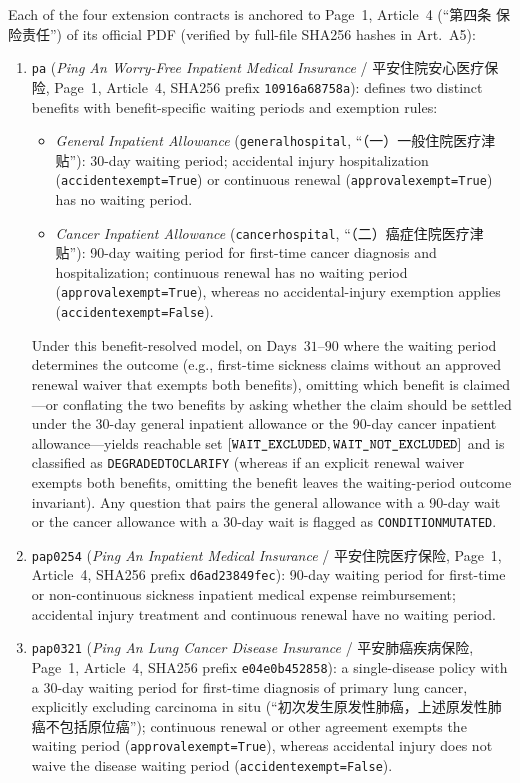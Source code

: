 \documentclass[10pt,twocolumn]{article}
\renewcommand{\_}{\textunderscore\allowbreak}
\begin{document}
Each of the four extension contracts is anchored to Page~1, Article~4 (``第四条 保险责任'') of its official PDF (verified by full-file SHA256 hashes in Art.~A5):
\begin{enumerate}[leftmargin=*,nosep]
  \item \texttt{pa\_2011\_36} (\emph{Ping An Worry-Free Inpatient Medical Insurance} / 平安住院安心医疗保险, Page~1, Article~4, SHA256 prefix \texttt{10916a68758a}): defines two distinct benefits with benefit-specific waiting periods and exemption rules:
  \begin{itemize}[leftmargin=*,nosep]
    \item \emph{General Inpatient Allowance} (\texttt{general\_hospital}, ``（一）一般住院医疗津贴''): 30-day waiting period; accidental injury hospitalization (\texttt{accident\_exempt=True}) or continuous renewal (\texttt{approval\_exempt=True}) has no waiting period.
    \item \emph{Cancer Inpatient Allowance} (\texttt{cancer\_hospital}, ``（二）癌症住院医疗津贴''): 90-day waiting period for first-time cancer diagnosis and hospitalization; continuous renewal has no waiting period (\texttt{approval\_exempt=True}), whereas no accidental-injury exemption applies (\texttt{accident\_exempt=False}).
  \end{itemize}
  Under this benefit-resolved model, on Days~$31\text{--}90$ where the waiting period determines the outcome (e.g., first-time sickness claims without an approved renewal waiver that exempts both benefits), omitting which benefit is claimed---or conflating the two benefits by asking whether the claim should be settled under the 30-day general inpatient allowance or the 90-day cancer inpatient allowance---yields reachable set $[\texttt{WAIT\_EXCLUDED}, \texttt{WAIT\_NOT\_EXCLUDED}]$ and is classified as \texttt{DEGRADED\_TO\_CLARIFY} (whereas if an explicit renewal waiver exempts both benefits, omitting the benefit leaves the waiting-period outcome invariant). Any question that pairs the general allowance with a 90-day wait or the cancer allowance with a 30-day wait is flagged as \texttt{CONDITION\_MUTATED}.
  \item \texttt{pa\_p0254} (\emph{Ping An Inpatient Medical Insurance} / 平安住院医疗保险, Page~1, Article~4, SHA256 prefix \texttt{d6ad23849fec}): 90-day waiting period for first-time or non-continuous sickness inpatient medical expense reimbursement; accidental injury treatment and continuous renewal have no waiting period.
  \item \texttt{pa\_p0321} (\emph{Ping An Lung Cancer Disease Insurance} / 平安肺癌疾病保险, Page~1, Article~4, SHA256 prefix \texttt{e04e0b452858}): a single-disease policy with a 30-day waiting period for first-time diagnosis of primary lung cancer, explicitly excluding carcinoma in situ (``初次发生原发性肺癌，上述原发性肺癌不包括原位癌''); continuous renewal or other agreement exempts the waiting period (\texttt{approval\_exempt=True}), whereas accidental injury does not waive the disease waiting period (\texttt{accident\_exempt=False}).

\end{enumerate}
\end{document}
